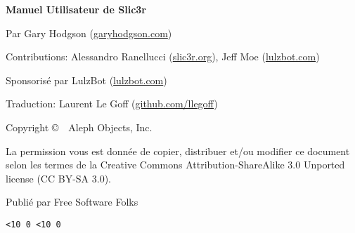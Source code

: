 \clearpage\null\vfill
\begingroup
\thispagestyle{empty}
\footnotesize\raggedright
\setlength{\parskip}{0.5\baselineskip}

\textbf{Manuel Utilisateur de Slic3r}

Par Gary Hodgson (\href{http://garyhodgson.com}{garyhodgson.com})

Contributions: Alessandro Ranellucci (\href{http://slic3r.org}{slic3r.org}), Jeff Moe (\href{http://lulzbot.com}{lulzbot.com})

Sponsoris\'e par LulzBot (\href{http://lulzbot.com}{lulzbot.com})

Traduction: Laurent Le Goff (\href{http://github.com/llegoff}{github.com/llegoff})

Copyright \copyright\ \the\year\ Aleph Objects, Inc.\par
La permission vous est donn\'ee de copier, distribuer et\slash ou modifier
ce document selon les termes de la
Creative Commons Attribution-ShareAlike 3.0 Unported license
(CC BY-SA 3.0).

Publi\'e par Free Software Folks

\hfill\texttt{\the\year\ifnum\month<10 0\fi\the\month
                \ifnum\day  <10 0\fi\the\day}
\endgroup
\pagebreak{}

